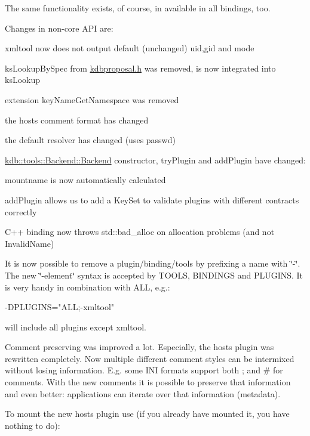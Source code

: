 The same functionality exists, of course, in available in all bindings, too.

Changes in non-\/core A\+PI are\+:


\begin{DoxyItemize}
\item xmltool now does not output default (unchanged) uid,gid and mode
\item ks\+Lookup\+By\+Spec from \hyperlink{kdbproposal_8h}{kdbproposal.\+h} was removed, is now integrated into ks\+Lookup
\item extension key\+Name\+Get\+Namespace was removed
\item the hosts comment format has changed
\item the default resolver has changed (uses passwd)
\item \hyperlink{classkdb_1_1tools_1_1Backend_a1650b149ebf313ee8cd3472247212263}{kdb\+::tools\+::\+Backend\+::\+Backend} constructor, try\+Plugin and add\+Plugin have changed\+:
\item mountname is now automatically calculated
\item add\+Plugin allows us to add a Key\+Set to validate plugins with different contracts correctly
\item C++ binding now throws std\+::bad\+\_\+alloc on allocation problems (and not Invalid\+Name)
\end{DoxyItemize}

It is now possible to remove a plugin/binding/tools by prefixing a name with \char`\"{}-\/\char`\"{}. The new \char`\"{}-\/element\char`\"{} syntax is accepted by T\+O\+O\+LS, B\+I\+N\+D\+I\+N\+GS and P\+L\+U\+G\+I\+NS. It is very handy in combination with A\+LL, e.\+g.\+:


\begin{DoxyCode}
-DPLUGINS="ALL;-xmltool"
\end{DoxyCode}


will include all plugins except xmltool.

Comment preserving was improved a lot. Especially, the hosts plugin was rewritten completely. Now multiple different comment styles can be intermixed without losing information. E.\+g. some I\+NI formats support both ; and \# for comments. With the new comments it is possible to preserve that information and even better\+: applications can iterate over that information (metadata).

To mount the new hosts plugin use (if you already have mounted it, you have nothing to do)\+:


